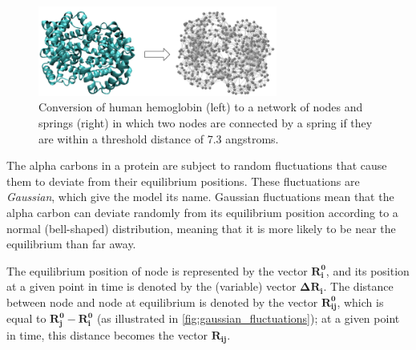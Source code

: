 \begin{figure}[h]
	\centering
	\mySfFamily
	\includegraphics[width = 0.7\textwidth]{../images/hemoglobin_enm.png}
	\caption{Conversion of human hemoglobin (left) to a network of nodes and springs (right) in which two nodes are connected by a spring if they are within a threshold distance of 7.3 angstroms.}
	\label{fig:hemoglobin_enm}
\end{figure}

The alpha carbons in a protein are subject to random fluctuations that cause them to deviate from their equilibrium positions. These fluctuations are \textit{Gaussian}, which give the model its name. Gaussian fluctuations mean that the alpha carbon can deviate randomly from its equilibrium position according to a normal (bell-shaped) distribution, meaning that it is more likely to be near the equilibrium than far away.

The equilibrium position of node  is represented by the vector $\mathbf{R_i^0}$, and its position at a given point in time is denoted by the (variable) vector $ \mathbf{\Delta R_i}$. The distance between node  and node  at equilibrium is denoted by the vector $\mathbf{R_{ij}^0}$, which is equal to $\mathbf{R_j^0} - \mathbf{R_i^0}$ (as illustrated in \autoref{fig:gaussian_fluctuations}); at a given point in time, this distance becomes the vector $\mathbf{R_{ij}}$.

